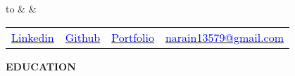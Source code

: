 \documentclass[10pt,a4]{article}
\def\hrulefill{\leavevmode\leaders\hrule height 1pt\hfill\kern0pt}		%
\begin{document}
{\selectfont	
	\renewcommand{\familydefault}{\sfdefault}

	\noindent
	\begin{tabu} to \textwidth {X[1] X[c] X[r]}
		  &    &   		\\
	\end{tabu}

 
	

    \begin{center}
    \begin{tabular} {p{} p{} p{} p{}}
        \raggedright\href{https://wwww.linkedin.com/in/narainp}{\textcolor{blue}{Linkedin}} & 
        \href{https://github.com/narain1}{\textcolor{blue}{Github}} & 
        \href{https://about.narain.dev}{\textcolor{blue}{Portfolio}} & 
        \raggedright\href{mailto:narain13579@gmail.com}{\textcolor{blue}{narain13579@gmail.com}} 
    \end{tabular}
    \end{center}
    
    \vspace{-2mm}

	
\vspace{0.25mm}
\begin{flushleft}
	{\Large \textbf{EDUCATION}} %
    

\end{flushleft}}
\end{document}
